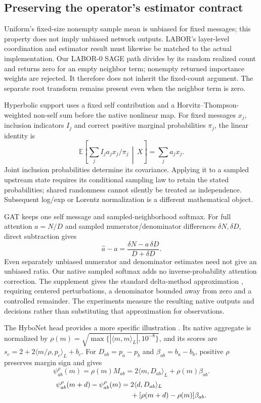 \documentclass[sigconf, nonacm]{acmart}
\newcommand{\E}{\mathbb E}
\newcommand{\ip}[2]{\langle #1,#2\rangle_L}
\begin{document}
\subsection{Preserving the operator's estimator contract}
Uniform's fixed-size nonempty sample mean is unbiased for fixed messages; this property does not imply unbiased network outputs. LABOR's layer-level coordination and estimator result \cite{balin2023labor} must likewise be matched to the actual implementation. Our LABOR-0 SAGE path divides by its random realized count and returns zero for an empty neighbor term; nonempty returned importance weights are rejected. It therefore does not inherit the fixed-count argument. The separate root transform remains present even when the neighbor term is zero.

Hyperbolic support uses a fixed self contribution and a Horvitz--Thompson-weighted non-self sum \cite{horvitz1952generalization} before the native nonlinear map. For fixed messages $x_j$, inclusion indicators $I_j$ and correct positive marginal probabilities $\pi_j$, the linear identity is
\begin{equation}
\E\!\left[\sum_j I_j a_jx_j/\pi_j\,\middle|\,X\right]=\sum_j a_jx_j.
\label{eq:ht}
\end{equation}
Joint inclusion probabilities determine its covariance. Applying it to a sampled upstream state requires its conditional sampling law to retain the stated probabilities; shared randomness cannot silently be treated as independence. Subsequent log/exp or Lorentz normalization is a different mathematical object.

GAT keeps one self message and sampled-neighborhood softmax. For full attention $a=N/D$ and sampled numerator/denominator differences $\delta N,\delta D$, direct subtraction gives
\begin{equation}
\widehat a-a=\frac{\delta N-a\,\delta D}{D+\delta D}.
\label{eq:attentionratio}
\end{equation}
Even separately unbiased numerator and denominator estimates need not give an unbiased ratio. Our native sampled softmax adds no inverse-probability attention correction. The supplement gives the standard delta-method approximation \cite{oehlert1992delta}, requiring centered perturbations, a denominator bounded away from zero and a controlled remainder. The experiments measure the resulting native outputs and decisions rather than substituting that approximation for observations.

The HyboNet head provides a more specific illustration \cite{chen2022fully}. Its native aggregate is normalized by $\rho(m)=\sqrt{\max\{|\ip{m}{m}|,10^{-8}\}}$, and its scores are $s_c=2+2\ip{m/\rho}{p_c}+b_c$. For $D_{ab}=p_a-p_b$ and $\beta_{ab}=b_a-b_b$, positive $\rho$ preserves margin sign and gives
\begin{equation}
\psi^\rho_{ab}(m)=\rho(m)M_{ab}=2\ip{m}{D_{ab}}+\rho(m)\beta_{ab}.
\label{eq:psi}
\end{equation}
\begin{align}
\psi^\rho_{ab}(m+d)-\psi^\rho_{ab}(m)
={}&2\ip{d}{D_{ab}}\notag\\
&+[\rho(m+d)-\rho(m)]\beta_{ab}.
\label{eq:lorentzfinite}
\end{align}
\end{document}
